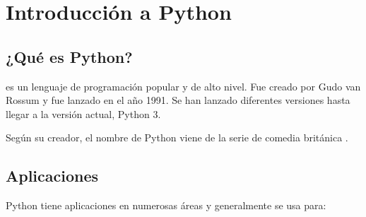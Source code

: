 \chapter{Introducción a Python}

\section{¿Qué es Python?}

 es un lenguaje de programación popular y de alto nivel.
Fue creado por Gudo van Rossum y fue lanzado en el año 1991.
Se han lanzado diferentes versiones hasta llegar a la versión actual, Python 3.

Según su creador, el nombre de Python viene de la serie de comedia británica .

\section{Aplicaciones}

Python tiene aplicaciones en numerosas áreas y generalmente se usa para:

